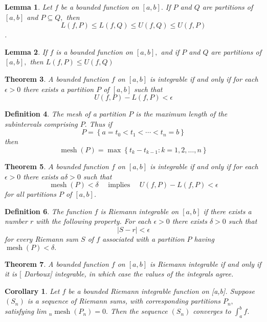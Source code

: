\documentclass[12pt]{article}
\newtheorem{theorem}{Theorem}[section]
\newtheorem{corollary}{Corollary}[theorem]
\newtheorem{lemma}[theorem]{Lemma}
\newtheorem{definition}[theorem]{Definition}
\begin{document}
\begin{lemma}
	Let $f$ be a bounded function on $[ a , b ] .$ If $P$ and $Q$ are partitions of
	$[ a , b ]$ and $P \subseteq Q ,$ then $$
	L ( f , P ) \leq L ( f , Q ) \leq U ( f , Q ) \leq U ( f , P )
	$$.
\end{lemma}
\begin{lemma}
	If $f$ is a bounded function on $[ a , b ] ,$ and if $P$ and $Q$ are partitions of
	$[ a , b ] ,$ then $L ( f , P ) \leq U ( f , Q )$
\end{lemma}
\begin{theorem}
	A bounded function $f$ on $[ a , b ]$ is integrable if and only if for each
	$\epsilon > 0$ there exists a partition $P$ of $[ a , b ]$ such that $$
	U ( f , P ) - L ( f , P ) < \epsilon
	$$
\end{theorem}
\begin{definition}
	The mesh of a partition $P$ is the maximum length of the subintervals
	comprising $P .$ Thus if $$
	P = \left\{ a = t _ { 0 } < t _ { 1 } < \cdots < t _ { n } = b \right\}
	$$ then $$
	\operatorname { mesh } ( P ) = \max \left\{ t _ { k } - t _ { k - 1 } : k = 1,2 , \ldots , n \right\}
	$$
\end{definition}
\begin{theorem}
	$A$ bounded function $f$ on $[ a , b ]$ is integrable if and only if for each
	$\epsilon > 0$ there exists $a \delta > 0$ such that $$
	\operatorname { mesh } ( P ) < \delta \quad \text { implies } \quad U ( f , P ) - L ( f , P ) < \epsilon
	$$ for all partitions $P$ of $[ a , b ]$.
\end{theorem}

\begin{definition}
	The function $f$ is Riemann integrable on $[ a , b ]$ if there exists a
	number $r$ with the following property. For each $\epsilon > 0$ there exists
	$\delta > 0$ such that $$
	| S - r | < \epsilon
	$$ for every Riemann sum $S$ of $f$ associated with a partition $P$ having
	$\operatorname { mesh } ( P ) < \delta .$ 
\end{definition}
\begin{theorem}
	A bounded function $f$ on $[ a , b ]$ is Riemann integrable if and only if
	it is $[$ Darboux] integrable, in which case the values of the integrals
	agree.
\end{theorem}
\begin{corollary}
	Let $f$ be a bounded Riemann integrable function on [a,b]. Suppose
	$\left( S _ { n } \right)$ is a sequence of Riemann sums, with corresponding partitions $P _ { n } ,$ satisfying lim $_ { n } \operatorname { mesh } \left( P _ { n } \right) = 0 .$ Then the sequence $\left( S _ { n } \right)$ converges
	to $\int _ { a } ^ { b } f .$
\end{corollary}
\end{document}
